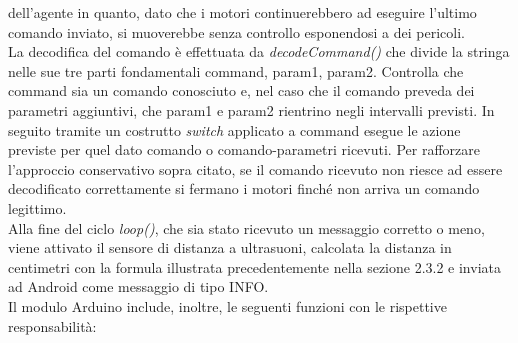 dell'agente in quanto, dato che i motori continuerebbero ad eseguire l'ultimo 
comando inviato, si muoverebbe senza controllo esponendosi a dei pericoli.\\
La decodifica del comando è effettuata da \emph{decodeCommand()} che divide la stringa 
nelle sue tre parti fondamentali command, param1, param2. Controlla che command
sia un comando conosciuto e, nel caso che il comando preveda dei parametri aggiuntivi,
che param1 e param2 rientrino negli intervalli previsti. In seguito tramite un costrutto 
\emph{switch} applicato a command esegue le azione previste per quel dato comando o comando-parametri
ricevuti. Per rafforzare l'approccio conservativo sopra citato, se il comando 
ricevuto non riesce ad essere decodificato correttamente 
si fermano i motori finché non arriva un comando legittimo.\\
Alla fine del ciclo \emph{loop()}, che sia stato ricevuto un messaggio corretto o meno,
viene attivato il sensore di distanza a ultrasuoni, calcolata la distanza in centimetri
con la formula illustrata precedentemente nella sezione 2.3.2 e inviata ad Android
come messaggio di tipo INFO.\\
Il modulo Arduino include, inoltre, le seguenti funzioni con le rispettive responsabilità:
